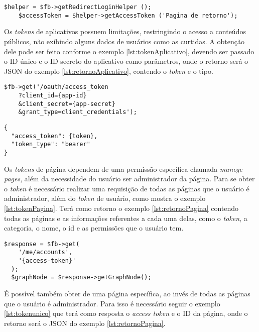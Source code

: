 \begin{lstlisting}[caption={Obtendo Token de acesso a página},label={lst:tokenUsuario}]
	$helper = $fb->getRedirectLoginHelper ();
	$accessToken = $helper->getAccessToken ('Pagina de retorno');
\end{lstlisting}

Os \textit{tokens} de aplicativos possuem limitações, restringindo o acesso a conteúdos públicos, não exibindo alguns dados de usuários como as curtidas. A obtenção dele pode ser feito conforme o exemplo \ref{lst:tokenAplicativo}, devendo ser passado o ID único e o ID secreto do aplicativo como parâmetros, onde o retorno será o JSON do exemplo \ref{lst:retornoAplicativo}, contendo o \textit{token} e o tipo.

\begin{lstlisting}[caption={Obtendo \textit{token} de acesso de aplicativos},label={lst:tokenAplicativo}]
$fb->get('/oauth/access_token
    ?client_id={app-id}
    &client_secret={app-secret}
    &grant_type=client_credentials');
\end{lstlisting}

\begin{lstlisting}[caption={Retorno \textit{token} de acesso de aplicativo \ref{lst:tokenAplicativo}},label={lst:retornoAplicativo}]
{
  "access_token": {token},
  "token_type": "bearer"
}
\end{lstlisting}

Os \textit{tokens} de página dependem de uma permissão específica chamada \textit{manege\underline{{ }}pages}, além da necessidade do usuário ser administrador da página. Para se obter o \textit{token} é necessário realizar uma requisição de todas as páginas que o usuário é administrador, além do \textit{token} de usuário, como mostra o exemplo \ref{lst:tokenPagina}. Terá como retorno o exemplo \ref{lst:retornoPagina} contendo todas as páginas e as informações referentes a cada uma delas, como o \textit{token}, a categoria, o nome, o id e as permissões que o usuário tem. 

\begin{lstlisting}[caption={Obtendo Token de acesso a página},label={lst:tokenPagina}]
  $response = $fb->get(
    '/me/accounts',
    '{access-token}'
  );
  $graphNode = $response->getGraphNode();
\end{lstlisting}

É possível também obter de uma página específica, ao invés de todas as páginas que o usuário é administrador. Para isso é necessário seguir o exemplo \ref{lst:tokenunico} que terá como resposta o \textit{access token} e o ID da página, onde o retorno será o JSON do exemplo \ref{lst:retornoPagina}.

